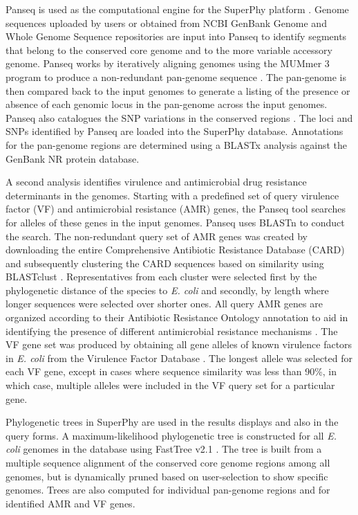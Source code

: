 \documentclass[a4paper,twoside]{article}
\begin{document}
Panseq is used as the computational engine for the SuperPhy platform \cite{laing_pan-genome_2010}. Genome sequences uploaded by users or obtained from NCBI GenBank Genome and Whole Genome Sequence repositories \cite{benson2013genbank} are input into Panseq to identify segments that belong to the conserved core genome and to the more variable accessory genome. Panseq works by iteratively aligning genomes using the MUMmer 3 program to produce a non-redundant pan-genome sequence \cite{laing_pan-genome_2010,kurtz2004versatile}. The pan-genome is then compared back to the input genomes to generate a listing of the presence or absence of each genomic locus in the pan-genome across the input genomes. Panseq also catalogues the SNP variations in the conserved regions \cite{laing_pan-genome_2010}.  The loci and SNPs identified by Panseq are loaded into the SuperPhy database. Annotations for the pan-genome regions are determined using a BLASTx analysis against the GenBank NR protein database.

A second analysis identifies virulence and antimicrobial drug resistance determinants in the genomes. Starting with a predefined set of query virulence factor (VF) and antimicrobial resistance (AMR) genes, the Panseq tool searches for alleles of these genes in the input genomes. Panseq uses BLASTn to conduct the search. The non-redundant query set of AMR genes was created by downloading the entire Comprehensive Antibiotic Resistance Database (CARD) \cite{mcarthur2012card} and subsequently clustering the CARD sequences based on similarity using BLASTclust \cite{altschul_gapped_1997}. Representatives from each cluster were selected first by the phylogenetic distance of the species to \textit{E. coli} and secondly, by length where longer sequences were selected over shorter ones. All query AMR genes are organized according to their Antibiotic Resistance Ontology annotation to aid in identifying the presence of different antimicrobial resistance mechanisms \cite{antezana_biological_2009}. The VF gene set was produced by obtaining all gene alleles of known virulence factors in \textit{E. coli} from the Virulence Factor Database \cite{chen2012vfdb,chen2005vfdb}.  The longest allele was selected for each VF gene, except in cases where sequence similarity was less than 90\%, in which case, multiple alleles were included in the VF query set for a particular gene.

Phylogenetic trees in SuperPhy are used in the results displays and also in the query forms. A maximum-likelihood phylogenetic tree is constructed for all \textit{E. coli} genomes in the database using FastTree v2.1 \cite{price_fasttree_2010}. The tree is built from a multiple sequence alignment of the conserved core genome regions among all genomes, but is dynamically pruned based on user-selection to show specific genomes. Trees are also computed for individual pan-genome regions and for identified AMR and VF genes.
\end{document}
